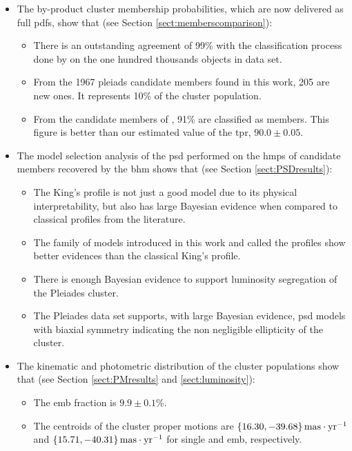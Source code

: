 \begin{itemize}
\item The by-product cluster membership probabilities, which are now delivered as full \glspl{pdf}, show that (see Section \ref{sect:memberscomparison}):
\begin{itemize}
\item  There is an outstanding agreement of 99\% with the classification process done by \citet{Bouy2015} on the one hundred thousands objects in data set.
\item From the 1967 pleiads candidate members found in this work, 205 are new ones. It represents 10\% of the cluster population. 
\item From the candidate members of \citet{Rebull2016}, 91\% are classified as members. This figure is better than our estimated value of the \acrlong{tpr}, $ 90.0 \pm0.05$.
\end{itemize}
\item The model selection analysis of the \acrfull{psd} performed on the \acrfull{hmps} of candidate members recovered by the \gls{bhm} shows that (see Section \ref{sect:PSDresults}):
\begin{itemize}
\item The King's profile \citep{King1962} is not just a good model due to its physical interpretability, but also has large Bayesian evidence when compared to classical profiles from the literature.
\item The family of models introduced in this work and called the  profiles show better evidences than the classical King's profile. 
\item There is enough Bayesian evidence to support luminosity segregation of the Pleiades cluster.
\item The Pleiades data set supports, with large Bayesian evidence, \gls{psd} models with biaxial symmetry indicating the non negligible ellipticity of the cluster.
\end{itemize}
\item The kinematic and photometric distribution of the cluster populations show that (see Section \ref{sect:PMresults} and \ref{sect:luminosity}):
\begin{itemize}
\item The \acrfull{emb} fraction is $9.9\pm0.1$\%.
\item The centroids of the cluster proper motions are $\{16.30,-39.68\}\,\rm{mas\cdot yr^{-1}}$ and $\{15.71,-40.31\}\,\rm{mas\cdot yr^{-1}}$ for single and \gls{emb}, respectively. 

\end{itemize}
\end{itemize}
